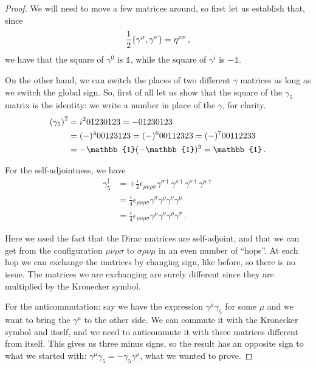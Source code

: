 \documentclass[main.tex]{subfiles}
\begin{document}
\begin{proof}
We will need to move a few matrices around, so first let us establish that, since 
%
\begin{align}
\frac{1}{2} \qty{\gamma^{\mu }, \gamma^{\nu }} = \eta^{\mu \nu }
\,,
\end{align}
%
we have that the square of \(\gamma^{0} \) is \(\mathbb{1}\), while the square of \(\gamma^{i} \) is \(- \mathbb{1}\). 

On the other hand, we can switch the places of two different \(\gamma \) matrices as long as we switch the global sign. So, first of all let us show that the square of the \(\gamma_5 \) matrix is the identity: we write a number in place of the \(\gamma \), for clarity.  
%
\begin{subequations}
\begin{align}
\qty(\gamma_{5})^2 &= i^2 01230123 = - 01230123  \\
&= (-)^{4} 00123123 = (-)^{6} 00112323 = (-)^{7} 00112233  \\
&= - \mathbb{1} (-\mathbb{1})^3 = \mathbb{1}
\,.
\end{align}
\end{subequations}

For the self-adjointness, we have 
%
\begin{subequations}
\begin{align}
\gamma_5 ^\dag &= + \frac{i}{4} \epsilon_{\mu \nu \rho \sigma } 
\gamma^{\sigma \dag} \gamma^{\rho \dag} \gamma^{\nu \dag} \gamma^{\mu \dag} \\
&= \frac{i}{4} \epsilon_{\mu \nu \rho \sigma } \gamma^{\sigma } \gamma^{\rho } \gamma^{\nu } \gamma^{\mu }  \\
&= \frac{i}{4} \epsilon_{\mu \nu \rho \sigma }
\gamma^{\mu } \gamma^{\nu } \gamma^{\rho } \gamma^{\sigma }
\,.
\end{align}
\end{subequations}

Here we used the fact that the Dirac matrices are self-adjoint, and that we can get from the configuration \(\mu \nu \rho \sigma \) to \(\sigma \rho \nu \mu \) in an even number of ``hops''. At each hop we can exchange the matrices by changing sign, like before, so there is no issue. The matrices we are exchanging are surely different since they are multiplied by the Kronecker symbol.

For the anticommutation: say we have the expression \(\gamma^{\mu } \gamma_5 \) for some \(\mu \) and we want to bring the \(\gamma^{\mu } \) to the other side. We can commute it with the Kronecker symbol and itself, and we need to anticommute it with three matrices different from itself. This gives us three minus signs, so the result has an opposite sign to what we started with: \(\gamma^{\mu } \gamma_5 = - \gamma_5 \gamma^{\mu }\), what we wanted to prove. 
\end{proof}
\end{document}
